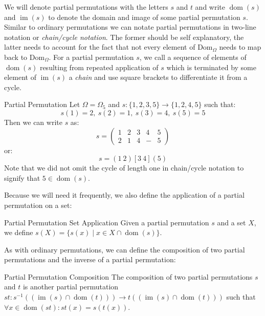 We will denote partial permutations with the letters $s$ and $t$ and write
$\operatorname{dom}(s)$ and $\operatorname{im}(s)$ to denote the domain and
image of some partial permutation $s$. Similar to ordinary permutations we can
notate partial permutations in two-line notation or \textit{chain/cycle
notation}. The former should be self explanatory, the latter needs to account
for the fact that not every element of
$\mathrm{Dom}_{\Omega}$ needs to map back to $\mathrm{Dom}_{\Omega}$.  For a
partial permutation $s$, we call a sequence of elements of
$\operatorname{dom}(s)$ resulting from repeated application of $s$ which is
terminated by some element of $\operatorname{im}(s)$ a \textit{chain} and use
square brackets to differentiate it from a cycle.
%
\begin{exmp}{Partial Permutation}
  Let $\Omega = \Omega_5$ and $s: \{1,2,3,5\} \rightarrow \{1,2,4,5\}$
  such that:
  \begin{equation*}
    s(1) = 2,\ s(2) = 1,\ s(3) = 4,\ s(5) = 5
  \end{equation*}
  Then we can write $s$ as:
  \begin{equation*}
    s = \begin{pmatrix} 1 & 2 & 3 & 4 & 5 \\ 2 & 1 & 4 & - & 5 \end{pmatrix}
  \end{equation*}
  or:
  \begin{equation*}
    s = (1\ 2)[3\ 4](5)
  \end{equation*}
  Note that we did not omit the cycle of length one in chain/cycle notation to
  signify that $5 \in \operatorname{dom}(s)$.
\end{exmp}
%
Because we will need it frequently, we also define the application of a partial
permutation on a set:

\begin{defn}{Partial Permutation Set Application}
  Given a partial permutation $s$ and a set $X$, we define $s(X) = \{s(x) \mid
  x \in X \cap \operatorname{dom}(s)\}$.
\end{defn}
%
As with ordinary permutations, we can define the composition of two partial
permutations and the inverse of a partial permutation:

\begin{defn}{Partial Permutation Composition}
  The composition of two partial permutations $s$ and $t$ is another partial
  permutation $st: s^{-1}((\operatorname{im}(s) \cap \operatorname{dom}(t)))
  \rightarrow t((\operatorname{im}(s) \cap \operatorname{dom}(t)))$ such that
  $\forall x \in \operatorname{dom}(st): st(x) = s(t(x))$.
\end{defn}

